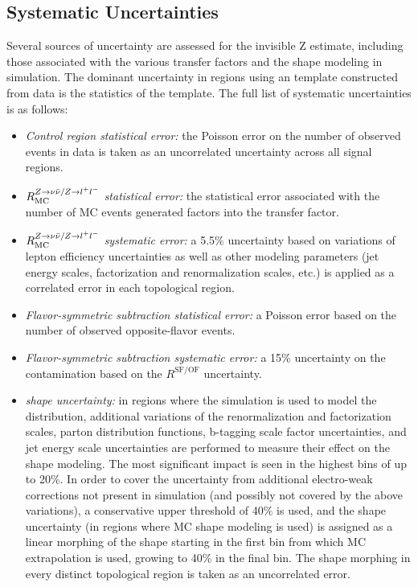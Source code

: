 \subsection{Systematic Uncertainties}
\label{subsec:zinvSyst}

Several sources of uncertainty are assessed for the invisible Z estimate, including those associated with the various transfer factors and the \mttwo shape modeling in simulation. The dominant uncertainty in regions using an \mttwo template constructed from data is the statistics of the template. The full list of systematic uncertainties is as follows:
\begin{itemize}
	\item {\it Control region statistical error:} the Poisson error on the number of observed events in \zll data is taken as an uncorrelated uncertainty across all signal regions.
	\item {\it $R_{\mathrm{MC}}^{Z\rightarrow\nu\bar{\nu}/Z\rightarrow l^+ l^-}$ statistical error:} the statistical error associated with the number of MC events generated factors into the transfer factor.
	\item {\it $R_{\mathrm{MC}}^{Z\rightarrow\nu\bar{\nu}/Z\rightarrow l^+ l^-}$ systematic error:} a 5.5\% uncertainty based on variations of lepton efficiency uncertainties as well as other modeling parameters (jet energy scales, factorization and renormalization scales, etc.) is applied as a correlated error in each topological region.
	\item {\it Flavor-symmetric subtraction statistical error:} a Poisson error based on the number of observed opposite-flavor events.
	\item {\it Flavor-symmetric subtraction systematic error:} a 15\% uncertainty on the \ttbar contamination based on the $R^{\mathrm{SF/OF}}$ uncertainty.
	\item {\it \mttwo shape uncertainty:} in regions where the simulation is used to model the \mttwo distribution, additional variations of the renormalization and factorization scales, parton distribution functions, b-tagging scale factor uncertainties, and jet energy scale uncertainties are performed to measure their effect on the \mttwo shape modeling. The most significant impact is seen in the highest \mttwo bins of up to 20\%. In order to cover the uncertainty from additional electro-weak corrections not present in simulation (and possibly not covered by the above variations), a conservative upper threshold of 40\% is used, and the shape uncertainty (in regions where MC \mttwo shape modeling is used) is assigned as a linear morphing of the \mttwo shape starting in the first bin from which MC extrapolation is used, growing to 40\% in the final bin. The shape morphing in every distinct topological region is taken as an uncorrelated error.
	
\end{itemize}



